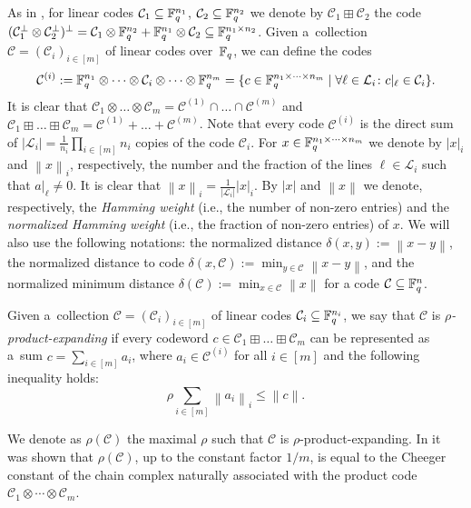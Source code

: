 \documentclass[11pt]{article}
\newcommand{\cC}{\mathcal{C}}
\newcommand{\cL}{\mathcal{L}}
\newcommand{\norm}[1]{\left\|#1\right\|}
\begin{document}
As in \cite{PK2022robust}, for linear codes $\cC_1\subseteq \F_q^{n_1}$, $\cC_2\subseteq \F_q^{n_2}$ we denote by $\cC_1\boxplus \cC_2$ the code $(\cC_1^\bot\otimes \cC_2^\bot)^\bot=\cC_1\otimes \F_q^{n_2}+\F_q^{n_1}\otimes \cC_2 \subseteq \F_q^{n_1\times n_2}$.
Given a~collection $\cC = (\cC_i)_{i\in [m]}$ of linear codes over~$\mathbb{F}_q$, we can define the codes 
\[
\cC^{(i)} := \F_q^{n_1} \otimes\dots\otimes \cC_i \otimes\dots\otimes \F_q^{n_m} = \{ c\in \F_q^{n_1\times\dots\times n_m} \mid \forall \ell\in \cL_i\colon c|_\ell\in  \cC_i \} .
\]
It is clear that $\cC_1\otimes \dots \otimes \cC_m = \cC^{(1)}\cap \dots \cap \cC^{(m)}$ and $\cC_1\boxplus \dots \boxplus \cC_m = \cC^{(1)}+ \dots + \cC^{(m)}$. Note that every code $\cC^{(i)}$ is the direct sum of $|\cL_i| = \frac{1}{n_i}\prod_{i\in [m]} n_i$ copies of the code $\cC_i$. 
For $x\in \mathbb{F}_q^{n_1\times\dots\times n_m}$ we denote by $|x|_i$ and $\norm{x}_i$, respectively, the number and the fraction of the lines $\ell\in\cL_i$ such that $a|_\ell \ne 0$. 
It is clear that $\norm{x}_i = \frac{1}{|\cL_i|}|x|_i$. By $|x|$ and $\norm{x}$ we denote, respectively, the \emph{Hamming weight} (i.e., the number of non-zero entries) and the \emph{normalized Hamming weight} (i.e., the fraction of non-zero entries) of $x$. 
We will also use the following notations: the normalized distance $\delta(x,y):=\norm{x-y}$, the normalized distance to code $\delta(x,\cC):=\min_{y\in\cC}\norm{x-y}$, and the normalized minimum distance $\delta(\cC):=\min_{x\in\cC}\norm{x}$ for a code $\cC\subseteq\F_q^n$.

\begin{definition}
Given a~collection $\cC = (\cC_i)_{i\in [m]}$ of linear codes $\cC_i\subseteq \F_q^{n_i}$, we say that $\cC$ is \emph{$\rho$-product-expanding} if every codeword $c\in \cC_1\boxplus \dots \boxplus \cC_m$ can be represented as a~sum $c = \sum_{i\in[m]} a_i$, where $a_i\in \cC^{(i)}$ for all $i\in [m]$ and the following inequality holds:
\begin{equation}\label{eq:prod-exp}
\rho\sum_{i\in [m]} \norm{a_i}_i \le \norm{c} .    
\end{equation}
\end{definition}

We denote as $\rho(\cC)$ the maximal $\rho$ such that $\cC$ is $\rho$-product-expanding. In \cite[Appendix B]{PK2022robust} it was shown that $\rho(\cC)$, up to the constant factor $1/m$, is equal to the Cheeger constant of the chain complex naturally associated with the product code $\cC_1\otimes\cdots\otimes \cC_m$.
\end{document}
